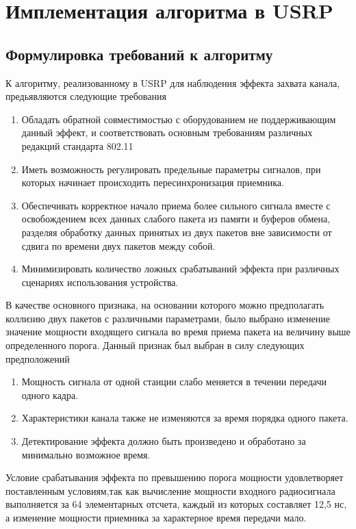 \documentclass{llncs}
\begin{document}
\section{Имплементация алгоритма в USRP}
\subsection{Формулировка требований к алгоритму}
К алгоритму, реализованному в USRP для наблюдения эффекта захвата канала,  предьявляются следующие требования
\begin{enumerate}
\item Обладать  обратной совместимостью с оборудованием не поддерживающим данный эффект, и соответствовать основным требованиям различных редакций стандарта 802.11
\item Иметь возможность регулировать предельные параметры  сигналов, при которых  начинает происходить пересинхронизация приемника. 
\item Обеспечивать корректное начало приема более сильного сигнала вместе с освобождением всех данных слабого пакета из памяти и буферов обмена, разделяя обработку данных принятых из двух пакетов вне зависимости от сдвига по времени двух пакетов между собой.
\item Минимизировать количество ложных срабатываний эффекта при различных сценариях 
использования устройства.
 
\end{enumerate}  В качестве
основного признака, на основании которого можно предполагать коллизию двух пакетов с различными параметрами, было выбрано изменение значение мощности входящего сигнала во время приема пакета на величину выше определенного порога. Данный признак был выбран в силу следующих предположений \begin{enumerate}
\item Мощность сигнала от одной станции слабо меняется в течении передачи одного кадра. 
\item Характеристики канала также не изменяются за время порядка одного пакета. 
\item Детектирование эффекта должно быть произведено и обработано за минимально возможное время.

\end{enumerate} 
Условие срабатывания эффекта по превышению порога мощности удовлетворяет поставленным условиям,так как вычисление мощности входного радиосигнала выполняется за 64 элементарных отсчета, каждый из которых составляет 12,5 нс, а изменение мощности приемника за характерное время передачи мало.
\\\
\end{document}

